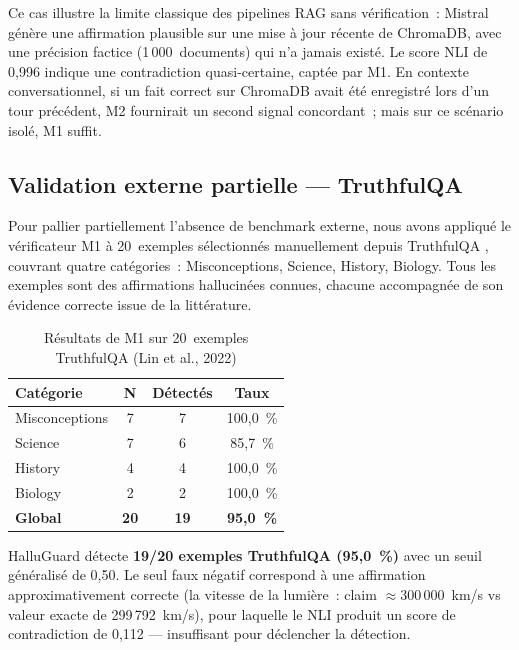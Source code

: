 \documentclass[12pt,a4paper]{article}
\begin{document}
Ce cas illustre la limite classique des pipelines RAG sans vérification~: Mistral génère une affirmation plausible sur une \og{}mise à jour récente\fg{} de ChromaDB, avec une précision factice (1\,000~documents) qui n'a jamais existé. Le score NLI de 0,996 indique une contradiction quasi-certaine, captée par M1. En contexte conversationnel, si un fait correct sur ChromaDB avait été enregistré lors d'un tour précédent, M2 fournirait un second signal concordant~; mais sur ce scénario isolé, M1 suffit.

\subsection{Validation externe partielle --- TruthfulQA}
\label{sec:truthfulqa}

Pour pallier partiellement l'absence de benchmark externe, nous avons appliqué le vérificateur M1 à 20~exemples sélectionnés manuellement depuis TruthfulQA \cite{lin2022truthfulqa}, couvrant quatre catégories~: Misconceptions, Science, History, Biology. Tous les exemples sont des affirmations hallucinées connues, chacune accompagnée de son évidence correcte issue de la littérature.

\begin{table}[H]
\centering
\caption{Résultats de M1 sur 20~exemples TruthfulQA (Lin et al., 2022)}
\label{tab:truthfulqa}
\renewcommand{\arraystretch}{1.2}
\begin{tabular}{lccc}
\toprule
\textbf{Catégorie} & \textbf{N} & \textbf{Détectés} & \textbf{Taux} \\
\midrule
Misconceptions & 7 & 7 & 100,0~\% \\
Science        & 7 & 6 & 85,7~\% \\
History        & 4 & 4 & 100,0~\% \\
Biology        & 2 & 2 & 100,0~\% \\
\midrule
\textbf{Global} & \textbf{20} & \textbf{19} & \textbf{95,0~\%} \\
\bottomrule
\end{tabular}
\end{table}

HalluGuard détecte \textbf{19/20 exemples TruthfulQA (95,0~\%)} avec un seuil généralisé de 0,50. Le seul faux négatif correspond à une affirmation approximativement correcte (la vitesse de la lumière~: claim \og{}$\approx$300\,000~km/s\fg{} vs valeur exacte de 299\,792~km/s), pour laquelle le NLI produit un score de contradiction de 0,112 --- insuffisant pour déclencher la détection.
\end{document}
